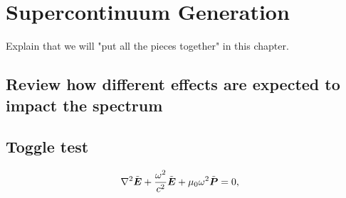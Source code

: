 \chapter{Supercontinuum Generation}
\label{ch:supercontinuum}

Explain that we will "put all the pieces together" in this chapter.

\section{Review how different effects are expected to impact the spectrum}

\section{Toggle test}


\begin{align}
    \nabla^{2}\tilde{\boldsymbol{E}}+\frac{\omega^{2}}{c^{2}}\tilde{\boldsymbol{E}}+\text{\ensuremath{\mu_{0}}}\omega^{2}\tilde{\boldsymbol{P}}&=0,
\end{align}